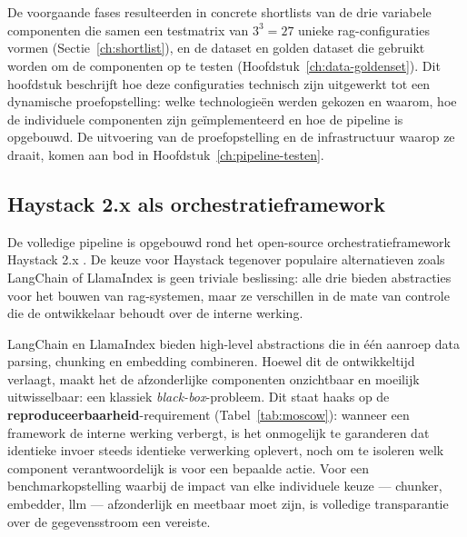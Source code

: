 \chapter{}
\label{ch:technische-uitvoering}

De voorgaande fases resulteerden in concrete shortlists van de drie variabele componenten die samen een testmatrix van $3^3 = 27$ unieke \gls{rag}-configuraties vormen (Sectie~\ref{ch:shortlist}), en de dataset en golden dataset die gebruikt worden om de componenten op te testen (Hoofdstuk~\ref{ch:data-goldenset}). Dit hoofdstuk beschrijft hoe deze configuraties technisch zijn uitgewerkt tot een dynamische proefopstelling: welke technologieën werden gekozen en waarom, hoe de individuele componenten zijn geïmplementeerd en hoe de pipeline is opgebouwd. De uitvoering van de proefopstelling en de infrastructuur waarop ze draait, komen aan bod in Hoofdstuk~\ref{ch:pipeline-testen}.

\section{Haystack 2.x als orchestratieframework}
\label{sec:haystack-keuze}

De volledige pipeline is opgebouwd rond het open-source orchestratieframework Haystack 2.x \autocite{HaystackPipelines2026}. De keuze voor Haystack tegenover populaire alternatieven zoals LangChain of LlamaIndex is geen triviale beslissing: alle drie bieden abstracties voor het bouwen van \gls{rag}-systemen, maar ze verschillen in de mate van controle die de ontwikkelaar behoudt over de interne werking.

LangChain en LlamaIndex bieden high-level abstractions die in één aanroep data parsing, chunking en embedding combineren. Hoewel dit de ontwikkeltijd verlaagt, maakt het de afzonderlijke componenten onzichtbaar en moeilijk uitwisselbaar: een klassiek \emph{black-box}-probleem. Dit staat haaks op de \textbf{reproduceerbaarheid}-requirement (Tabel~\ref{tab:moscow}): wanneer een framework de interne werking verbergt, is het onmogelijk te garanderen dat identieke invoer steeds identieke verwerking oplevert, noch om te isoleren welk component verantwoordelijk is voor een bepaalde actie. Voor een benchmarkopstelling waarbij de impact van elke individuele keuze — chunker, embedder, \gls{llm} — afzonderlijk en meetbaar moet zijn, is volledige transparantie over de gegevensstroom een vereiste.

